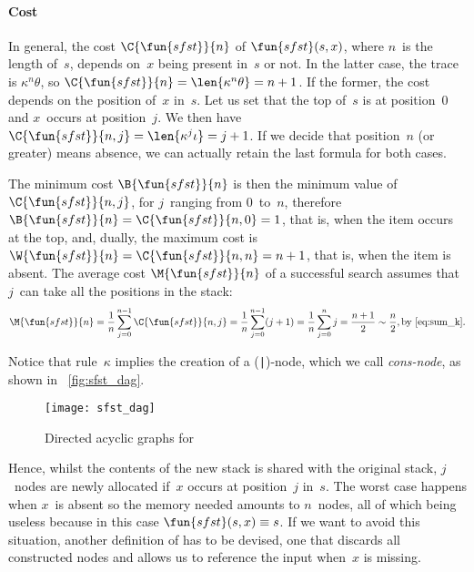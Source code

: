 \paragraph{Cost}

In general, the cost
\(\C{\fun{sfst}}{n}\) of
\(\fun{sfst}(s,x)\), where \(n\)~is the length of~\(s\), depends
on~\(x\) being present in~\(s\) or not. In the latter case, the trace
is \(\kappa^n\theta\), so \(\C{\fun{sfst}}{n} = \len{\kappa^n\theta} =
n + 1\). If the former, the cost depends on the position of~\(x\)
in~\(s\). Let us set that the top of~\(s\) is at position~\(0\) and
\(x\)~occurs at position~\(j\). We then have \(\C{\fun{sfst}}{n,j} =
\len{\kappa^j\iota} = j + 1\). If we
decide that position~\(n\) (or greater) means absence, we can actually
retain the last formula for both cases.

The minimum cost \(\B{\fun{sfst}}{n}\)
is then the minimum value
of \(\C{\fun{sfst}}{n,j}\), for \(j\)~ranging from \(0\)~to~\(n\),
therefore \(\B{\fun{sfst}}{n} = \C{\fun{sfst}}{n,0} = 1\), that is,
when the item occurs at the top, and, dually, the maximum
cost
is \(\W{\fun{sfst}}{n} =
\C{\fun{sfst}}{n,n} = n + 1\), that is, when the item is absent. The
average cost
\(\M{\fun{sfst}}{n}\) of a successful search assumes that \(j\)~can
take all the positions in the stack:
\begin{equation*}
  \M{\fun{sfst}}{n} = \frac{1}{n}\sum_{j=0}^{n-1}\C{\fun{sfst}}{n,j} =
  \frac{1}{n}\sum_{j=0}^{n-1}(j+1) = \frac{1}{n}\sum_{j=0}^{n}j
  = \frac{n+1}{2} \sim \frac{n}{2}, \text{by}~\eqref{eq:sum_k}.
\end{equation*}

Notice that rule~\(\kappa\) implies the creation of a
(\texttt{|})\hyp{}node, which we call
\emph{cons\hyp{}node}, as shown in
\fig~\vref{fig:sfst_dag}.
\begin{figure}
\centering
\texttt{[image: sfst\_dag]}
\caption{Directed acyclic graphs for }
\label{fig:sfst_dag}
\end{figure}
Hence, whilst the contents of the new stack is shared with the
original stack, \(j\)~nodes are newly allocated if~\(x\) occurs at
position~\(j\) in~\(s\). The worst case happens when \(x\)~is absent
so the memory needed amounts to
\(n\)~nodes, all of which being useless because in this case
\(\fun{sfst}(s,x) \equiv s\). If we want to avoid this situation,
another definition of  has to be devised, one that
discards all constructed nodes and allows us to reference the input
when~\(x\) is missing.

